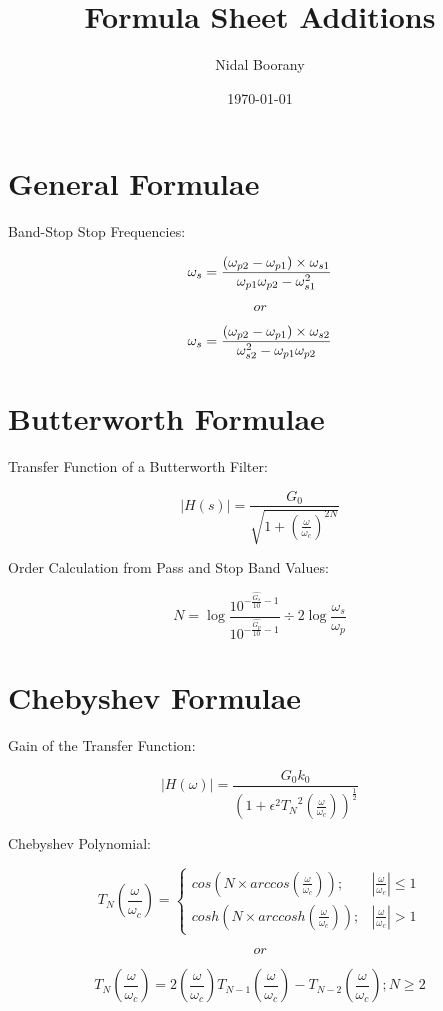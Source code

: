 \documentclass{article}
\begin{document}
\title{Formula Sheet Additions}
\author{Nidal Boorany}
\date{\today}
\maketitle

\section{General Formulae}

Band-Stop Stop Frequencies:

$$\omega_{s} = \frac{(\omega_{p2} - \omega_{p1})\times \omega_{s1}}{\omega_{p1}\omega_{p2}-\omega_{s1}^2} \space$$

$$or$$

$$\omega_{s} = \frac{(\omega_{p2} - \omega_{p1})\times \omega_{s2}}{\omega_{s2}^2-\omega_{p1}\omega_{p2}} \space$$

\section{Butterworth Formulae}
Transfer Function of a Butterworth Filter:

$$|H(s)| = \frac{G_0}{\sqrt{1 + (\frac{\omega}{\omega_c})^{2N}}}$$

Order Calculation from Pass and Stop Band Values:

$$N = \log{\frac{10^{- \frac{\hat{G_s}}{10} - 1}}{10^{- \frac{\hat{G_p}}{ 10} - 1}}} \div {2 \log{\frac{\omega_s}{\omega_p}}}$$

\section{Chebyshev Formulae}

Gain of the Transfer Function:

$$|H(\omega)| = \frac{{G_0} {k_0}}{(1 + {\epsilon}^2 {T_N}^2(\frac{\omega}{\omega_c}))^{\frac{1}{2}}}$$

Chebyshev Polynomial:

$$T_N (\frac{\omega}{\omega_c}) = 
\begin{cases} 
cos(N \times arccos(\frac{\omega}{\omega_c})); & |\frac{\omega}{\omega_c}| \leqslant 1 \\
cosh(N \times arccosh(\frac{\omega}{\omega_c})); & |\frac{\omega}{\omega_c}| > 1
\end{cases}$$

$$or$$

$$T_N(\frac{\omega}{\omega_c}) = 2(\frac{\omega}{\omega_c}) T_{N-1}(\frac{\omega}{\omega_c})-T_{N-2}(\frac{\omega}{\omega_c}); N \geq 2$$
\end{document}
